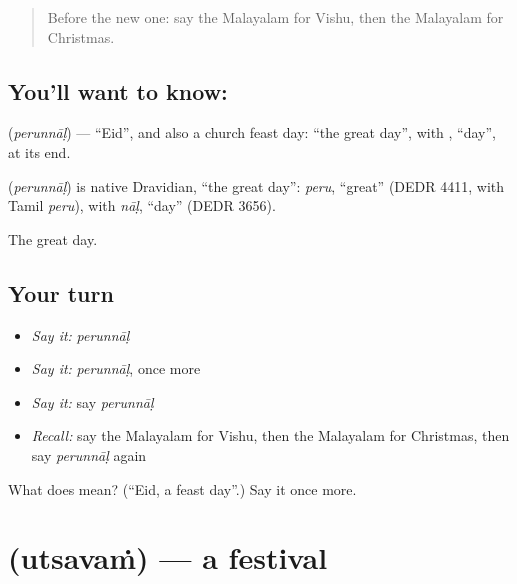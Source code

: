 \label{lesson:ML-C141-eid}



\begin{quote}
Before the new one: say the Malayalam for Vishu, then the Malayalam for Christmas.
\end{quote}

\subsection*{You'll want to know: }
\textbf{} (\emph{perunnāḷ}) — \textquotedblleft{}Eid\textquotedblright{}, and also a church feast day: \textquotedblleft{}the great day\textquotedblright{}, with \textbf{}, \textquotedblleft{}day\textquotedblright{}, at its end.

\begin{cousinweb}
\textbf{} (\emph{perunnāḷ}) is native Dravidian, \textquotedblleft{}the great day\textquotedblright{}: \emph{peru}, \textquotedblleft{}great\textquotedblright{} (DEDR 4411, with Tamil \emph{peru}), with \emph{nāḷ}, \textquotedblleft{}day\textquotedblright{} (DEDR 3656).
\end{cousinweb}

\begin{grammarlens}[title={What you've built}]
The great day.
\end{grammarlens}

\subsection*{Your turn}
\begin{itemize}
\raggedright
  \item \emph{Say it:} \emph{perunnāḷ}
  \item \emph{Say it:} \emph{perunnāḷ}, once more
  \item \emph{Say it:} say \emph{perunnāḷ}
  \item \emph{Recall:} say the Malayalam for Vishu, then the Malayalam for Christmas, then say \emph{perunnāḷ} again
\end{itemize}

\begin{tcolorbox}[breakable,colback=teal!4,colframe=teal!35!black,title={Before you move on}]
What does  mean? (\textquotedblleft{}Eid, a feast day\textquotedblright{}.) Say it once more.
\end{tcolorbox}
\section[\texorpdfstring{\ml{ഉത്സവം} (utsavaṁ)}{ഉത്സവം (utsavaṁ)}]{ (utsavaṁ) — a festival}

